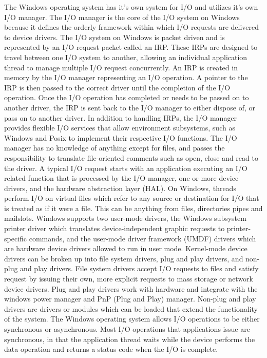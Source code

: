 \documentclass[letterpaper,10pt,draftclsnofoot,onecolumn,titlepage]{IEEEtran}
\begin{document}
	The Windows operating system has it's own system for I/O and utilizes it's own I/O manager.
	The I/O manager is the core of the I/O system on Windows because it defines the orderly framework within which I/O requests are delivered to device drivers. \cite{Windows}
	The I/O system on Windows is packet driven and is represented by an I/O request packet called an IRP.
	These IRPs are designed to travel between one I/O system to another, allowing an individual application thread to manage multiple I/O request concurrently.
	An IRP is created in memory by the I/O manager representing an I/O operation.
	A pointer to the IRP is then passed to the correct driver until the completion of the I/O operation.
	Once the I/O operation has completed or needs to be passed on to another driver, the IRP is sent back to the I/O manager to either dispose of, or pass on to another driver.
	In addition to handling IRPs, the I/O manager provides flexible I/O services that allow environment subsystems, such as Windows and Posix to implement their respective I/O functions.
	The I/O manager has no knowledge of anything except for files, and passes the responsibility to translate file-oriented comments such as open, close and read to the driver.
	A typical I/O request starts with an application executing an I/O related function that is processed by the I/O manager, one or more device drivers, and the hardware abstraction layer (HAL).
	On Windows, threads perform I/O on virtual files which refer to any source or destination for I/O that is treated as if it were a file.
	This can be anything from files, directories pipes and mailslots.
	Windows supports two user-mode drivers, the Windows subsystem printer driver which translates device-independent graphic requests to printer-specific commands, and the user-mode driver framework (UMDF) drivers which are hardware device drivers allowed to run in user mode.
	Kernel-mode device drivers can be broken up into file system drivers, plug and play drivers, and non-plug and play drivers.
	File system drivers accept I/O requests to files and satisfy request by issuing their own, more explicit requests to mass storage or network device drivers.
	Plug and play drivers work with hardware and integrate with the windows power manager and PnP (Plug and Play) manager.
	Non-plug and play drivers are drivers or modules which can be loaded that extend the functionality of the system.
	The Windows operating system allows I/O operations to be either synchronous or asynchronous.
	Most I/O operations that applications issue are synchronous, in that the application thread waits while the device performs the data operation and returns a status code when the I/O is complete.
\end{document}
